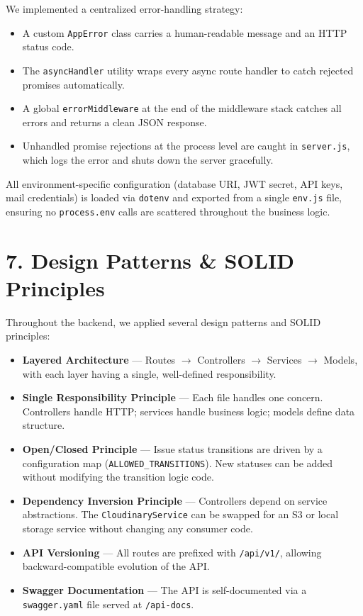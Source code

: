 \documentclass[12pt,a4paper]{article}
\begin{document}
We implemented a centralized error-handling strategy:

\begin{itemize}[nosep]
    \item A custom \texttt{AppError} class carries a human-readable message and an HTTP status code.
    \item The \texttt{asyncHandler} utility wraps every async route handler to catch rejected promises automatically.
    \item A global \texttt{errorMiddleware} at the end of the middleware stack catches all errors and returns a clean JSON response.
    \item Unhandled promise rejections at the process level are caught in \texttt{server.js}, which logs the error and shuts down the server gracefully.
\end{itemize}

All environment-specific configuration (database URI, JWT secret, API keys, mail credentials) is loaded via \texttt{dotenv} and exported from a single \texttt{env.js} file, ensuring no \texttt{process.env} calls are scattered throughout the business logic.

\section{7. Design Patterns \& SOLID Principles}

Throughout the backend, we applied several design patterns and SOLID principles:

\begin{itemize}[nosep]
    \item \textbf{Layered Architecture} --- Routes $\rightarrow$ Controllers $\rightarrow$ Services $\rightarrow$ Models, with each layer having a single, well-defined responsibility.
    \item \textbf{Single Responsibility Principle} --- Each file handles one concern. Controllers handle HTTP; services handle business logic; models define data structure.
    \item \textbf{Open/Closed Principle} --- Issue status transitions are driven by a configuration map (\texttt{ALLOWED\_TRANSITIONS}). New statuses can be added without modifying the transition logic code.
    \item \textbf{Dependency Inversion Principle} --- Controllers depend on service abstractions. The \texttt{CloudinaryService} can be swapped for an S3 or local storage service without changing any consumer code.
    \item \textbf{API Versioning} --- All routes are prefixed with \texttt{/api/v1/}, allowing backward-compatible evolution of the API.
    \item \textbf{Swagger Documentation} --- The API is self-documented via a \texttt{swagger.yaml} file served at \texttt{/api-docs}.
\end{itemize}
\end{document}
